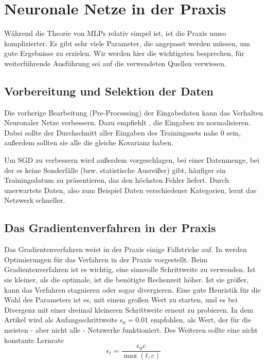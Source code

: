 \section{Neuronale Netze in der Praxis}
Während die Theorie von MLPs relativ simpel ist, ist die Praxis umso komplizierter. Es gibt sehr viele Parameter, die angepasst werden müssen, um gute Ergebnisse zu erzielen. Wir werden hier die wichtigsten besprechen, für weiterführende Ausführung sei auf die verwendeten Quellen verwiesen. 

\subsection{Vorbereitung und Selektion der Daten}
Die vorherige Bearbeitung (Pre-Processing) der Eingabedaten kann das Verhalten Neuronaler Netze verbessern. 
Dazu empfiehlt \cite{lecunefficient}, die Eingaben zu normalisieren.
Dabei sollte der Durchschnitt aller Eingaben des Trainingssets nahe $0$ sein, außerdem sollten sie alle die gleiche Kovarianz haben.

Um SGD zu verbessern wird außerdem vorgeschlagen, bei einer Datenmenge, bei der es keine Sonderfälle (bzw. statistische Ausreißer) gibt, häufiger ein Trainingsdatum zu präsentieren, das den höchsten Fehler liefert. Durch unerwartete Daten, also zum Beispiel Daten verschiedener Kategorien, lernt das Netzwerk schneller.

\subsection{Das Gradientenverfahren in der Praxis}
Das Gradientenverfahren weist in der Praxis einige Fallstricke auf. In \cite{bengio2012practical} werden Optimierungen für das Verfahren in der Praxis vorgestellt. 
Beim Gradientenverfahren ist es wichtig, eine sinnvolle Schrittweite zu verwenden. Ist sie kleiner, als die optimale, ist die benötigte Rechenzeit höher. Ist sie größer, kann das Verfahren stagnieren oder sogar divergieren. Eine gute Heuristik für die Wahl des Parameters ist es, mit einem großen Wert zu starten, und es bei Divergenz mit einer dreimal kleineren Schrittweite erneut zu probieren.
In dem Artikel wird als Anfangsschrittweite $\epsilon_0 = 0.01$ empfohlen, als Wert, der für die meisten - aber nicht alle - Netzwerke funktioniert.
Des Weiteren sollte eine nicht konstante Lernrate 
\begin{equation}
	\epsilon_t = \frac{\epsilon_0 c}{\max(t, c)}
\end{equation}

